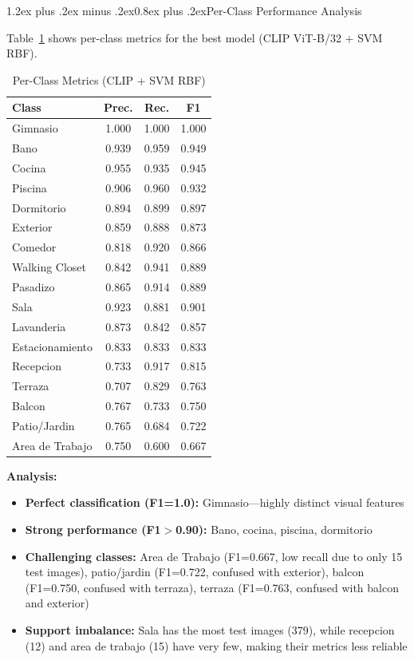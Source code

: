 \documentclass[conference]{IEEEtran}
\makeatletter
\renewcommand{\subsection}{\@startsection{subsection}{2}{\z@}%
  {1.2ex plus .2ex minus .2ex}{0.8ex plus .2ex}{\normalfont\bfseries}}
\makeatother
\begin{document}
\subsection{Per-Class Performance Analysis}

Table~\ref{tab:perclass} shows per-class metrics for the best model (CLIP ViT-B/32 + SVM RBF).

\begin{table}[htbp]
\caption{Per-Class Metrics (CLIP + SVM RBF)}
\begin{center}
\begin{tabular}{@{}lccc@{}}
\toprule
\textbf{Class} & \textbf{Prec.} & \textbf{Rec.} & \textbf{F1} \\
\midrule
Gimnasio & 1.000 & 1.000 & 1.000 \\
Bano & 0.939 & 0.959 & 0.949 \\
Cocina & 0.955 & 0.935 & 0.945 \\
Piscina & 0.906 & 0.960 & 0.932 \\
Dormitorio & 0.894 & 0.899 & 0.897 \\
Exterior & 0.859 & 0.888 & 0.873 \\
Comedor & 0.818 & 0.920 & 0.866 \\
Walking Closet & 0.842 & 0.941 & 0.889 \\
Pasadizo & 0.865 & 0.914 & 0.889 \\
Sala & 0.923 & 0.881 & 0.901 \\
Lavanderia & 0.873 & 0.842 & 0.857 \\
Estacionamiento & 0.833 & 0.833 & 0.833 \\
Recepcion & 0.733 & 0.917 & 0.815 \\
Terraza & 0.707 & 0.829 & 0.763 \\
Balcon & 0.767 & 0.733 & 0.750 \\
Patio/Jardin & 0.765 & 0.684 & 0.722 \\
Area de Trabajo & 0.750 & 0.600 & 0.667 \\
\bottomrule
\end{tabular}
\label{tab:perclass}
\end{center}
\end{table}

\textbf{Analysis:}
\begin{itemize}
\item \textbf{Perfect classification (F1=1.0):} Gimnasio---highly distinct visual features
\item \textbf{Strong performance (F1$>$0.90):} Bano, cocina, piscina, dormitorio
\item \textbf{Challenging classes:} Area de Trabajo (F1=0.667, low recall due to only 15 test images), patio/jardin (F1=0.722, confused with exterior), balcon (F1=0.750, confused with terraza), terraza (F1=0.763, confused with balcon and exterior)
\item \textbf{Support imbalance:} Sala has the most test images (379), while recepcion (12) and area de trabajo (15) have very few, making their metrics less reliable
\end{itemize}
\end{document}
